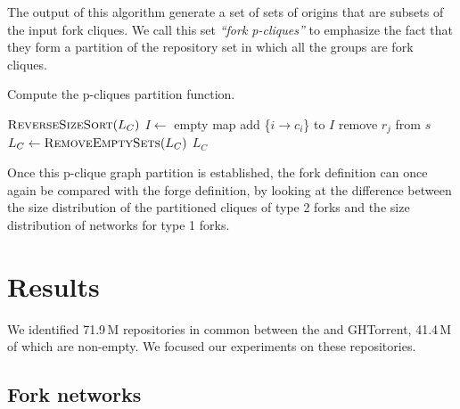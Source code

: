 The output of this algorithm generate a set of sets of origins that are subsets
of the input fork cliques. We call this set \emph{``fork p-cliques''} to
emphasize the fact that they form a partition of the repository set in which
all the groups are fork cliques.

\begin{algorithm}[t]
    \caption{Compute the p-cliques partition function.}%
    \label{algo:fork-clique-partition}
    \begin{algorithmic}
        \State $\Call{ReverseSizeSort}{L_C}$ 
        \State $I \gets$ empty map 
            \State add \{$i \rightarrow c_i$\} to $I$
        \EndFor
                    \vspace{-\baselineskip}
                        \State remove $r_j$ from $s$
                    \EndIf
                \EndFor
            \EndFor
        \EndFor
        \State $L_C \gets \Call{RemoveEmptySets}{L_C}$ 
        \State \Return $L_C$
    \EndFunction
    \end{algorithmic}
\end{algorithm}

Once this p-clique graph partition is established, the fork definition can once
again be compared with the forge definition, by looking at the difference
between the size distribution of the partitioned cliques of type 2 forks and
the size distribution of networks for type 1 forks.


\section{Results}%
\label{sec:forks-results}

We identified 71.9\,M repositories in common between the \SWHGD{} and GHTorrent,
41.4\,M of which are non-empty. We focused our experiments on these
repositories.

\subsection{Fork networks}%
\label{sec:results-fork-networks}

